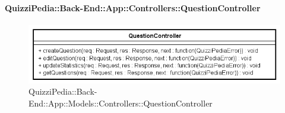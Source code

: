 \paragraph{QuizziPedia::Back-End::App::Controllers::QuestionController}
\label{QuizziPedia::Back-End::App::Controllers::QuestionController}
\begin{figure}[ht]
	\centering
	\includegraphics[scale=0.8]{UML/Classi/Back-End/QuizziPedia_Back-End_App_Controllers_questionController.png}
	\caption{QuizziPedia::Back-End::App::Models::Controllers::QuestionController}
\end{figure}
\FloatBarrier
